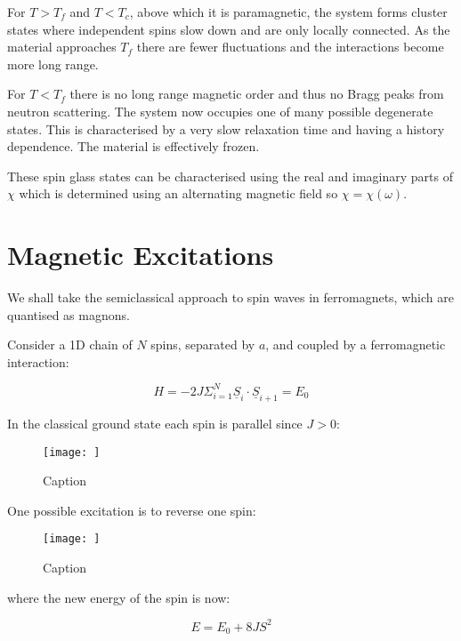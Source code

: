 \noindent For $T > T_f$ and $T < T_c$, above which it is paramagnetic, the system forms cluster states where independent spins slow down and are only locally connected. As the material approaches $T_f$ there are fewer fluctuations and the interactions become more long range.

\noindent For $T < T_f$ there is no long range magnetic order and thus no Bragg peaks from neutron scattering. The system now occupies one of many possible degenerate states. This is characterised by a very slow relaxation time and having a history dependence. The material is effectively frozen.

\noindent These spin glass states can be characterised using the real and imaginary parts of $\chi$ which is determined using an alternating magnetic field so $\chi = \chi(\omega)$. 

\section{Magnetic Excitations}

We shall take the semiclassical approach to spin waves in ferromagnets, which are quantised as magnons.

\noindent Consider a 1D chain of $N$ spins, separated by $a$, and coupled by a ferromagnetic interaction:

\begin{equation}
    H = -2J \Sigma_{i = 1}^N \underline{S}_i \cdot \underline{S}_{i + 1} = E_0
    \label{SpinWaveHamiltonian}
\end{equation}

\noindent In the classical ground state each spin is parallel since $J > 0$:

\begin{figure}
    \centering
    \texttt{[image: ]}
    \caption{Caption}
    \label{fig:enter-label}
\end{figure}

\noindent One possible excitation is to reverse one spin:

\begin{figure}
    \centering
    \texttt{[image: ]}
    \caption{Caption}
    \label{fig:enter-label}
\end{figure}

\noindent where the new energy of the spin is now:

\begin{equation}
    E = E_0 + 8JS^2
    \label{ReversedSpinEnergy}
\end{equation}

